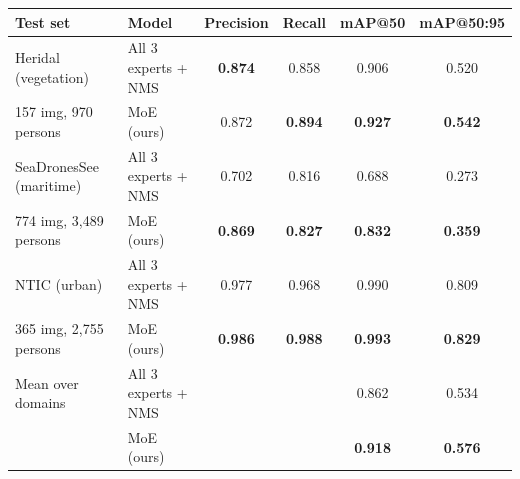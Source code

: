 \begin{tabular}{llcccc}
\toprule
Test set & Model & Precision & Recall & mAP@50 & mAP@50:95 \\
\midrule
Heridal (vegetation) & All 3 experts + NMS & \textbf{0.874} & 0.858 & 0.906 & 0.520 \\
157 img, 970 persons & MoE (ours) & 0.872 & \textbf{0.894} & \textbf{0.927} & \textbf{0.542} \\
\midrule
SeaDronesSee (maritime) & All 3 experts + NMS & 0.702 & 0.816 & 0.688 & 0.273 \\
774 img, 3,489 persons & MoE (ours) & \textbf{0.869} & \textbf{0.827} & \textbf{0.832} & \textbf{0.359} \\
\midrule
NTIC (urban) & All 3 experts + NMS & 0.977 & 0.968 & 0.990 & 0.809 \\
365 img, 2,755 persons & MoE (ours) & \textbf{0.986} & \textbf{0.988} & \textbf{0.993} & \textbf{0.829} \\
\midrule
Mean over domains & All 3 experts + NMS & & & 0.862 & 0.534 \\
 & MoE (ours) & & & \textbf{0.918} & \textbf{0.576} \\
\bottomrule
\end{tabular}
